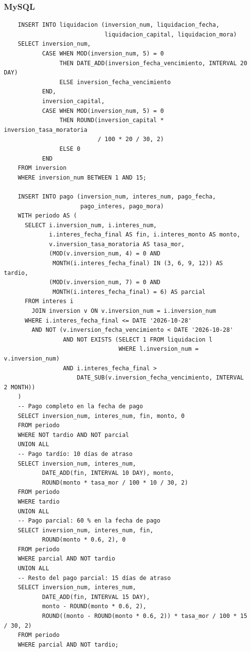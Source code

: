\subsubsection{MySQL}

\begin{verbatim}
	INSERT INTO liquidacion (inversion_num, liquidacion_fecha,
	                         liquidacion_capital, liquidacion_mora)
	SELECT inversion_num,
	       CASE WHEN MOD(inversion_num, 5) = 0
	            THEN DATE_ADD(inversion_fecha_vencimiento, INTERVAL 20 DAY)
	            ELSE inversion_fecha_vencimiento
	       END,
	       inversion_capital,
	       CASE WHEN MOD(inversion_num, 5) = 0
	            THEN ROUND(inversion_capital * inversion_tasa_moratoria
	                       / 100 * 20 / 30, 2)
	            ELSE 0
	       END
	FROM inversion
	WHERE inversion_num BETWEEN 1 AND 15;

	INSERT INTO pago (inversion_num, interes_num, pago_fecha,
	                  pago_interes, pago_mora)
	WITH periodo AS (
	  SELECT i.inversion_num, i.interes_num,
	         i.interes_fecha_final AS fin, i.interes_monto AS monto,
	         v.inversion_tasa_moratoria AS tasa_mor,
	         (MOD(v.inversion_num, 4) = 0 AND
	          MONTH(i.interes_fecha_final) IN (3, 6, 9, 12)) AS tardio,
	         (MOD(v.inversion_num, 7) = 0 AND
	          MONTH(i.interes_fecha_final) = 6) AS parcial
	  FROM interes i
	    JOIN inversion v ON v.inversion_num = i.inversion_num
	  WHERE i.interes_fecha_final <= DATE '2026-10-28'
	    AND NOT (v.inversion_fecha_vencimiento < DATE '2026-10-28'
	             AND NOT EXISTS (SELECT 1 FROM liquidacion l
	                             WHERE l.inversion_num = v.inversion_num)
	             AND i.interes_fecha_final >
	                 DATE_SUB(v.inversion_fecha_vencimiento, INTERVAL 2 MONTH))
	)
	-- Pago completo en la fecha de pago
	SELECT inversion_num, interes_num, fin, monto, 0
	FROM periodo
	WHERE NOT tardio AND NOT parcial
	UNION ALL
	-- Pago tardío: 10 días de atraso
	SELECT inversion_num, interes_num,
	       DATE_ADD(fin, INTERVAL 10 DAY), monto,
	       ROUND(monto * tasa_mor / 100 * 10 / 30, 2)
	FROM periodo
	WHERE tardio
	UNION ALL
	-- Pago parcial: 60 % en la fecha de pago
	SELECT inversion_num, interes_num, fin,
	       ROUND(monto * 0.6, 2), 0
	FROM periodo
	WHERE parcial AND NOT tardio
	UNION ALL
	-- Resto del pago parcial: 15 días de atraso
	SELECT inversion_num, interes_num,
	       DATE_ADD(fin, INTERVAL 15 DAY),
	       monto - ROUND(monto * 0.6, 2),
	       ROUND((monto - ROUND(monto * 0.6, 2)) * tasa_mor / 100 * 15 / 30, 2)
	FROM periodo
	WHERE parcial AND NOT tardio;
\end{verbatim}

